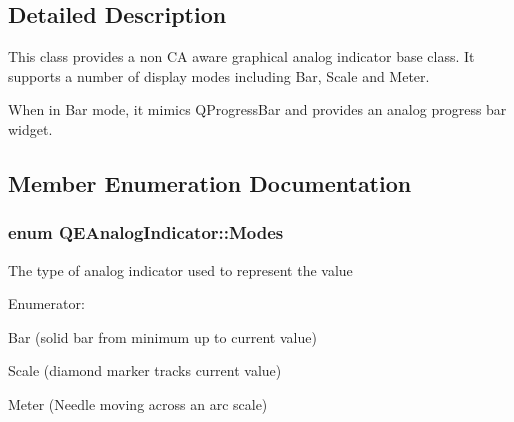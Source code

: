 \subsection{Detailed Description}
This class provides a non CA aware graphical analog indicator base class. It supports a number of display modes including Bar, Scale and Meter.

When in Bar mode, it mimics QProgressBar and provides an analog progress bar widget. 

\subsection{Member Enumeration Documentation}
\hypertarget{classQEAnalogIndicator_a3f42266f1b130ee612e6187fd146a724}{
\subsubsection[{Modes}]{\setlength{\rightskip}{0pt plus 5cm}enum {\bf QEAnalogIndicator::Modes}}}
\label{classQEAnalogIndicator_a3f42266f1b130ee612e6187fd146a724}
The type of analog indicator used to represent the value \begin{Desc}
\item[Enumerator: ]\par
\begin{description}
\item[{\em 
\hypertarget{classQEAnalogIndicator_a3f42266f1b130ee612e6187fd146a724a4be72d6b96cfbbb8c0ad7efb5da6360b}{
Bar}
\label{classQEAnalogIndicator_a3f42266f1b130ee612e6187fd146a724a4be72d6b96cfbbb8c0ad7efb5da6360b}
}]Bar (solid bar from minimum up to current value) \item[{\em 
\hypertarget{classQEAnalogIndicator_a3f42266f1b130ee612e6187fd146a724a8b1456174555ea28c6a5e5c2b8a6f3de}{
Scale}
\label{classQEAnalogIndicator_a3f42266f1b130ee612e6187fd146a724a8b1456174555ea28c6a5e5c2b8a6f3de}
}]Scale (diamond marker tracks current value) \item[{\em 
\hypertarget{classQEAnalogIndicator_a3f42266f1b130ee612e6187fd146a724ab3a2b4d488bfdfe1864c171c44d8d214}{
Meter}
\label{classQEAnalogIndicator_a3f42266f1b130ee612e6187fd146a724ab3a2b4d488bfdfe1864c171c44d8d214}
}]Meter (Needle moving across an arc scale) \end{description}
\end{Desc}

